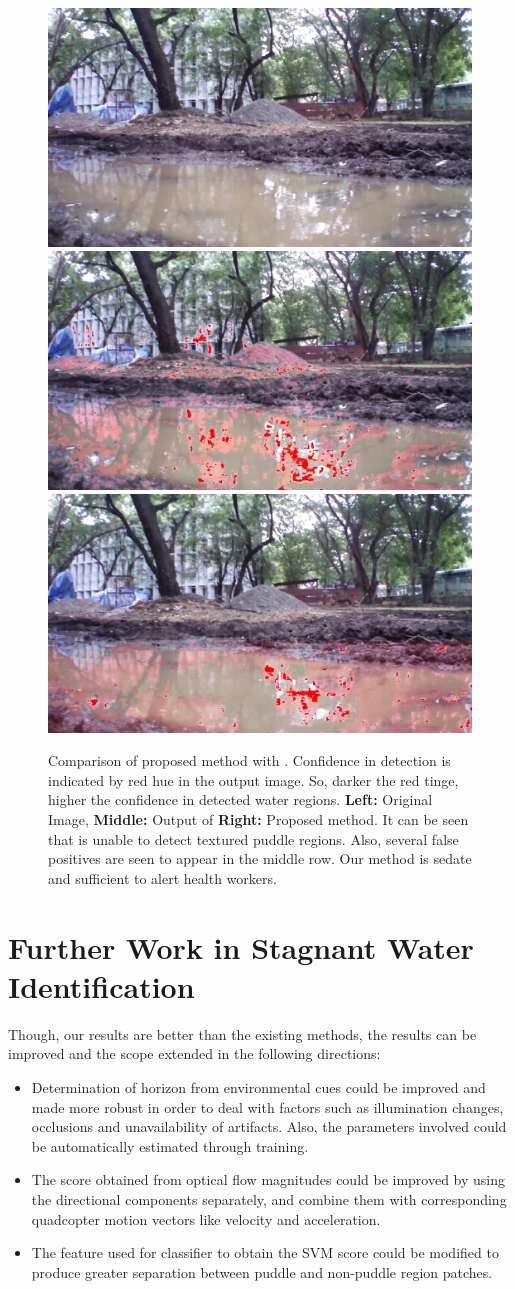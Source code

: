 \documentclass[11pt]{article}
\begin{document}
\begin{figure}
  \includegraphics[width=0.32\linewidth]{stagnantWater/results/dataset_63full/IMG_PAIR_102_1} \hfill
  \includegraphics[width=0.32\linewidth]{stagnantWater/results/dataset_63full/output_102_jpl2} \hfill
  \includegraphics[width=0.32\linewidth]{stagnantWater/results/dataset_63full/output_102}
  	
  \caption{Comparison of proposed method with \cite{rankin2004daytime}. Confidence in detection is indicated by red hue in the output image. 
So, darker the red tinge, higher the confidence in detected water regions. \textbf{Left:} Original Image,
    \textbf{Middle:} Output of \cite{rankin2004daytime} \textbf{Right:}
    Proposed method. It can be seen that \cite{rankin2004daytime} is unable to
    detect textured puddle regions. Also, several false positives are
    seen to appear in the middle row.  Our method is sedate and
    sufficient to alert health workers.}
\label{fig:comparison}
\end{figure}

\section{Further Work in Stagnant Water Identification}
Though, our results are better than the existing methods, the results can be improved and the scope
extended in the following directions:
\begin{itemize}
  \item Determination of horizon from environmental cues could be improved and
  made more robust in order to deal with factors such as illumination changes,
  occlusions and unavailability of artifacts. Also, the parameters involved
  could be automatically estimated through training.
  \item The score obtained from optical flow magnitudes could be improved by
  using the directional components separately, and combine them with
  corresponding quadcopter motion vectors like velocity and acceleration.
  \item The feature used for classifier to obtain the SVM score could be
  modified to produce greater separation between puddle and non-puddle region
  patches.
\end{itemize}
\end{document}
